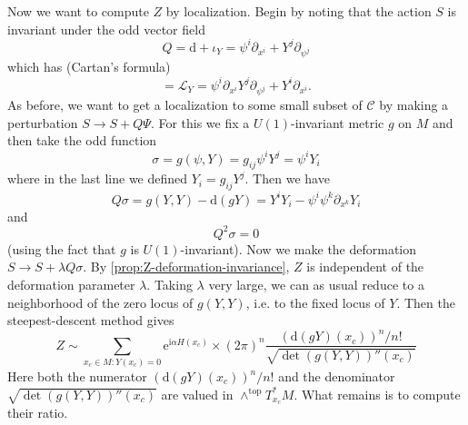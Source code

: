 \documentclass[12pt,letterpaper,reqno]{article}
\numberwithin{equation}{section}
\newcommand{\cC}{\ensuremath{\mathcal C}}
\newcommand{\cL}{\ensuremath{\mathcal L}}
\newcommand{\I}{{\mathrm i}}
\newcommand{\e}{{\mathrm e}}
\newcommand{\de}{\mathrm{d}}
\newcommand{\rmtop}{\mathrm{top}}
\newcommand{\fixme}[1]{{\color{orange}{[#1]}}}
\begin{document}
Now we want to compute $Z$ by localization.
Begin by noting that the action $S$ is invariant under the odd vector field
\begin{equation}
  Q = \de + \iota_Y = \psi^i \partial_{x^i} + Y^j \partial_{\psi^j}
\end{equation}
which has (Cartan's formula)
\begin{equation}
  [Q,Q] = \cL_Y = \psi^i \partial_{x^i} Y^j \partial_{\psi^j} + Y^i \partial_{x^i}.
\end{equation}
As before, we want to get a localization to some small subset of
$\cC$ by making a perturbation $S \to S + Q \Psi$.
For this we fix a $U(1)$-invariant metric $g$ on $M$ and then 
take the odd function
\begin{equation}
  \sigma = g(\psi, Y) = g_{ij} \psi^i Y^j = \psi^i Y_i
\end{equation}
where in the last line we defined $Y_i = g_{ij} Y^j$.
Then we have
\begin{equation}
  Q \sigma = g(Y,Y) - \de(gY) = Y^i Y_i - \psi^i \psi^k \partial_{x^k} Y_i
\end{equation}
and 
\begin{equation}
  Q^2 \sigma = 0
\end{equation}
(using the fact that $g$ is $U(1)$-invariant).
Now we make the deformation $S \to S + \lambda Q \sigma$.
By \autoref{prop:Z-deformation-invariance},
$Z$ is independent of the deformation parameter $\lambda$.
Taking $\lambda$ very large, we can as usual 
reduce to a neighborhood of the zero locus of $g(Y,Y)$, i.e. to the fixed locus of $Y$. Then the steepest-descent method gives
\begin{equation} \label{eq:dh-steepest-descent}
  Z \sim \sum_{x_c \in M: Y(x_c) = 0} \e^{\I \alpha H(x_c)} \times (2\pi)^n \frac{(\de(gY)(x_c))^n/n!}{\sqrt{\det (g(Y,Y))''(x_c)}}
\end{equation}
Here both the numerator
$(\de(gY)(x_c))^n/n!$
and the denominator
$\sqrt{\det (g(Y,Y))''(x_c)}$ 
are valued in $\wedge^\rmtop T^*_{x_c} M$.
\fixme{it would be better to be careful about 
twists by orientation bundle here; in what follows we always
use the standard orientations}
What remains is to compute their ratio.
\end{document}

